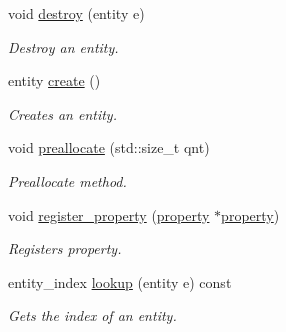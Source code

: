 \begin{DoxyCompactItemize}
void \hyperlink{classophidian_1_1entity__system_1_1entity__system_a63bdb64c338de595c3518ccf49a9dc55}{destroy} (entity e)
\begin{DoxyCompactList}\small\item\em Destroy an entity. \end{DoxyCompactList}\item 
entity \hyperlink{classophidian_1_1entity__system_1_1entity__system_a9b1130217610603b71b003bc18d4a7b0}{create} ()
\begin{DoxyCompactList}\small\item\em Creates an entity. \end{DoxyCompactList}\item 
void \hyperlink{classophidian_1_1entity__system_1_1entity__system_a59f5ccd12bb53e2e223ed41516814714}{preallocate} (std\-::size\-\_\-t qnt)
\begin{DoxyCompactList}\small\item\em Preallocate method. \end{DoxyCompactList}\item 
void \hyperlink{classophidian_1_1entity__system_1_1entity__system_a1f172075a677fdddf98133fd9914a454}{register\-\_\-property} (\hyperlink{classophidian_1_1entity__system_1_1property}{property} $\ast$\hyperlink{classophidian_1_1entity__system_1_1property}{property})
\begin{DoxyCompactList}\small\item\em Registers property. \end{DoxyCompactList}\item 
entity\-\_\-index \hyperlink{classophidian_1_1entity__system_1_1entity__system_ab0ec0cc5dd829cd9cd67f51dab21cc51}{lookup} (entity e) const 
\begin{DoxyCompactList}\small\item\em Gets the index of an entity. \end{DoxyCompactList}\end{DoxyCompactItemize}


